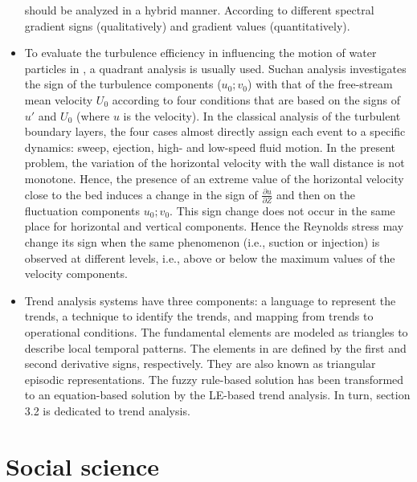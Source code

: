 \documentclass[11pt]{book}
\begin{document}
\begin{itemize}
should be analyzed in a hybrid manner. According to different spectral
gradient signs (qualitatively) and gradient values (quantitatively).
\item To evaluate the turbulence efficiency in influencing the motion of
\textquotedbl water particles\textquotedbl{} in \cite{corvaro2014fluid},
a quadrant analysis is usually used. Suchan analysis investigates
the sign of the turbulence components ($u_{0};v_{0}$) with that of
the free-stream mean velocity $U_{0}$ according to four conditions
that are based on the signs of $u'$ and $U_{0}$ (where $u$ is the
velocity). In the classical analysis of the turbulent boundary layers,
the four cases almost directly assign each event to a specific dynamics:
sweep, ejection, high- and low-speed fluid motion. In the present
problem, the variation of the horizontal velocity with the wall distance
is not monotone. Hence, the presence of an extreme value of the horizontal
velocity close to the bed induces a change in the sign of $\frac{\partial u}{\partial Z}$
and then on the fluctuation components $u_{0};v_{0}$. This sign change
does not occur in the same place for horizontal and vertical components.
Hence the Reynolds stress may change its sign when the same phenomenon
(i.e., suction or injection) is observed at different levels, i.e.,
above or below the maximum values of the velocity components.
\item Trend analysis systems have three components: a language to represent
the trends, a technique to identify the trends, and mapping from trends
to operational conditions. The fundamental elements are modeled as
triangles to describe local temporal patterns. The elements in \cite{juuso2018intelligent}
are defined by the first and second derivative signs, respectively.
They are also known as triangular episodic representations. The fuzzy
rule-based solution has been transformed to an equation-based solution
by the LE-based trend analysis. In turn, section 3.2 is dedicated
to trend analysis.
\end{itemize}

\section{Social science}

\end{document}
